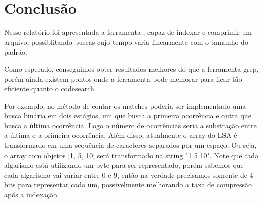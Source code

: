 \section{Conclusão}

Nesse relatório foi apresentada a ferramenta \ipmt, capaz de indexar e comprimir
um arquivo, possiblitando buscas cujo tempo varia linearmente com o tamanho do
padrão.

Como esperado, conseguimos obter resultados melhores do que a ferramenta
grep, porém ainda existem pontos onde a ferramenta pode melhorar para ficar tão
eficiente quanto o codesearch.

Por exemplo, no método de contar os matches
poderia ser implementado uma busca binária em dois estágios, um que busca a
primeira ocorrência e outra que busca a última ocorrência. Logo o número de
ocorrências seria a substração entre a última e a primeira ocorrência.
Além disso, atualmente o array do LSA é transformado em uma sequência de
caracteres separados por um espaço. Ou seja, o array com objetos [1, 5, 10] será
transformado na string "1 5 10". Note que cada algarismo está utilizando um byte
para ser representado, porém sabemos que cada algarismo vai variar entre 0 e 9,
então na verdade precisamos somente de 4 bits para representar cada um,
possivelmente melhorando a taxa de compressão após a indexação.

